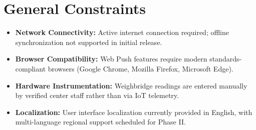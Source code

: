 \section{General Constraints}
\begin{itemize}
  \item \textbf{Network Connectivity:} Active internet connection required; offline synchronization not supported in initial release.
  \item \textbf{Browser Compatibility:} Web Push features require modern standards-compliant browsers (Google Chrome, Mozilla Firefox, Microsoft Edge).
  \item \textbf{Hardware Instrumentation:} Weighbridge readings are entered manually by verified center staff rather than via IoT telemetry.
  \item \textbf{Localization:} User interface localization currently provided in English, with multi-language regional support scheduled for Phase II.
\end{itemize}
